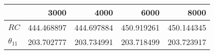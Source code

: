\begin{tabular}{lrrrr}
\toprule
{} &        3000 &        4000 &        6000 &        8000 \\
\midrule
$RC$          &  444.468897 &  444.697884 &  450.919261 &  450.144345 \\
$\theta_{11}$ &  203.702777 &  203.734991 &  203.718499 &  203.723917 \\
\bottomrule
\end{tabular}
